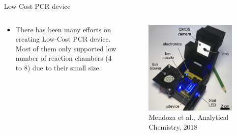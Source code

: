 \documentclass[UKenglish, aspectratio = 169]{beamer}
\begin{document}
\begin{frame}{Low Cost PCR device}
	\begin{columns}
		\begin{column}[T]{0.5\textwidth}
			\vspace*{4ex}
			\begin{itemize}
				\item There has been many efforts on creating Low-Cost PCR device. Most of them only supported low number of reaction chambers (4 to 8) due to their small size.
			\end{itemize}
		\end{column}
		\begin{column}{0.5\textwidth}
			\begin{figure}
				\centering
				\includegraphics[scale=0.25]{figs/pcr1.png}
				\caption{\tiny{Mendoza et al., Analytical Chemistry, 2018}}
			\end{figure}
		\end{column}
	\end{columns}
\end{frame}
\end{document}
